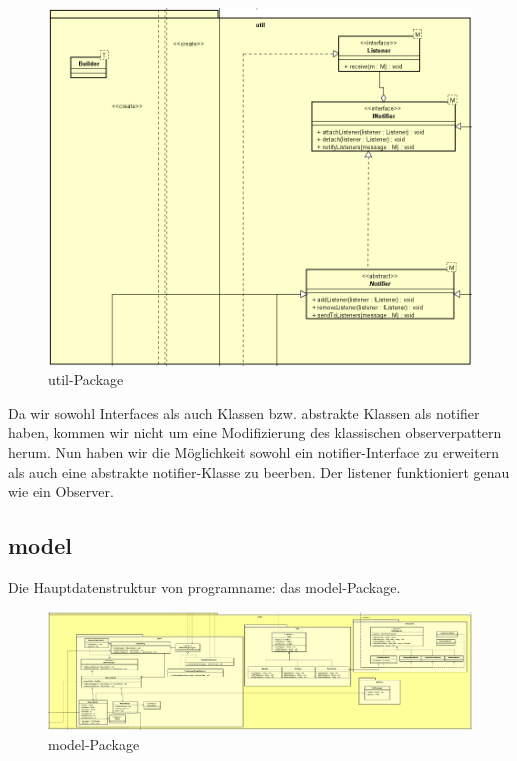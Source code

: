 \begin{figure}[H]
  \centering
  \includegraphics[width=\textwidth]{../diagramimages/util.png}
  \caption{util-Package}
\end{figure}

Da wir sowohl Interfaces als auch Klassen bzw. abstrakte Klassen als
\gls{notifier} haben, kommen wir nicht um eine Modifizierung des klassischen
\gls{observerpattern} herum. Nun haben wir die Möglichkeit sowohl ein
\gls{notifier}-Interface zu erweitern als auch eine abstrakte
\gls{notifier}-Klasse zu beerben. Der \gls{listener} funktioniert genau wie ein
Observer.


\subsection{model}
\label{subsec:model}

Die Hauptdatenstruktur von \gls{programname}: das model-Package.

\begin{figure}[H]
  \centering
  \includegraphics[width=\textwidth]{../diagramimages/model.png}
  \caption{model-Package}
\end{figure}

